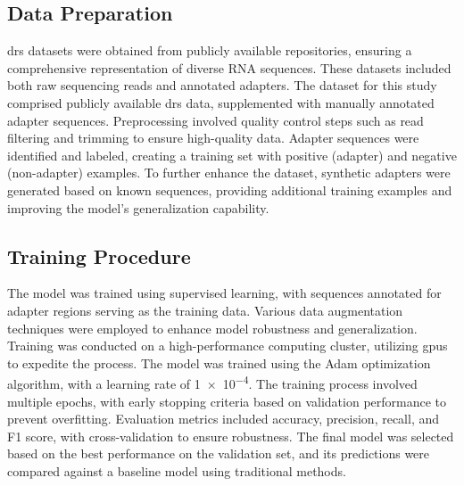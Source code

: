 \documentclass[pdflatex, sn-mathphys-num, lineno]{sn-jnl}%
\theoremstyle{thmstyleone}%
\theoremstyle{thmstyletwo}%
\theoremstyle{thmstylethree}%
\begin{document}
\subsection{Data Preparation}

\gls{drs} datasets were obtained from publicly available repositories, ensuring a comprehensive representation of diverse RNA sequences.
These datasets included both raw sequencing reads and annotated adapters.
The dataset for this study comprised publicly available \gls{drs} data, supplemented with manually annotated adapter sequences.
Preprocessing involved quality control steps such as read filtering and trimming to ensure high-quality data.
Adapter sequences were identified and labeled, creating a training set with positive (adapter) and negative (non-adapter) examples.
To further enhance the dataset, synthetic adapters were generated based on known sequences, providing additional training examples and improving the model's generalization capability.


\subsection{Training Procedure}

The model was trained using supervised learning, with sequences annotated for adapter regions serving as the training data.
Various data augmentation techniques were employed to enhance model robustness and generalization.
Training was conducted on a high-performance computing cluster, utilizing \glspl{gpu} to expedite the process.
The model was trained using the Adam optimization algorithm, with a learning rate of \num{1e-4}.
The training process involved multiple epochs, with early stopping criteria based on validation performance to prevent overfitting.
Evaluation metrics included accuracy, precision, recall, and F1 score, with cross-validation to ensure robustness.
The final model was selected based on the best performance on the validation set, and its predictions were compared against a baseline model using traditional methods.
\end{document}
